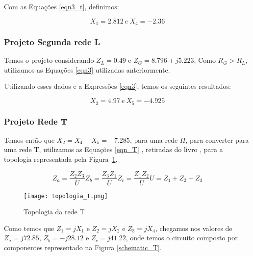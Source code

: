 \documentclass[a4paper,12pt]{proc}
\begin{document}
\noindent Com as Equações \ref{eqn3_t}, definimos:

\[X_{1} = 2.812 ~e~ X_{4} = -2.36\]

\subsubsection{Projeto Segunda rede L}

Temos o projeto considerando $Z_{L} = 0.49$ e $Z_{G} = 8.796 + j5.223 $, Como $R_{G} > R_{L}$, utilizamos as Equações \ref{eqn3} utilizadas anteriormente.

\noindent Utilizando esses dados e a Expressões \ref{eqn3}, temos os seguintes resultados:

\[X_{3} = 4.97 ~e~ X_{5} = -4.925\]

\subsubsection{Projeto Rede T}

\noindent Temos então que $X_{2} = X_{4} + X_{5} = - 7.285$, para uma rede $\Pi$, para converter para uma rede T, utilizamos as  Equações \ref{eqn_T} , retiradas do livro \cite{Orfanidis2003}, para a topologia representada pela Figura~\ref{topologia_T}.

\begin{subequations}
    \label{eqn_T}
    \begin{equation}
        Z_{a} = \frac{Z_{2}Z_{3}}{U}
        \label{eqn_T:1}
    \end{equation}
    \begin{equation}
        Z_{b} = \frac{Z_{3}Z_{1}}{U}
        \label{eqn_T:2}
    \end{equation}
    \begin{equation}
        Z_{c} = \frac{Z_{1}Z_{2}}{U}
        \label{eqn_T:3}
    \end{equation}
    \begin{equation}
        U = Z_{1}+Z_{2}+Z_{3}
        \label{eqn_T:4}
    \end{equation}
\end{subequations}

\begin{figure}[htbp]
    \centering
    \texttt{[image: topologia\_T.png]}
    \caption{Topologia da rede T}
    \label{topologia_T}
\end{figure}

\noindent Como temos que $Z_{1} = jX_{1}$ e $Z_{2} = jX_{2}$ e $Z_{3} = jX_{4}$, chegamos nos valores de $Z_{a} = j72.85$, $Z_{b} = -j28.12$ e $Z_{c} = j41.22$, onde temos o circuito composto por componentes representado na Figura \ref{schematic_T}.
\end{document}
